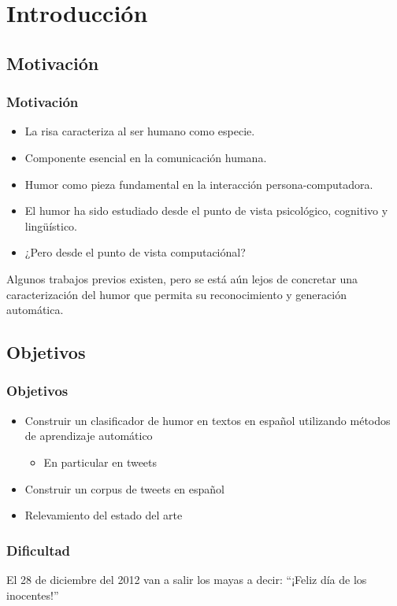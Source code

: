 \section{Introducción} 

\subsection{Motivación}

\begin{frame}[allowframebreaks]
    \frametitle{Motivación}
    \begin{itemize}
        \item La risa caracteriza al ser humano como especie.
        \item Componente esencial en la comunicación humana.
        \item Humor como pieza fundamental en la interacción persona-computadora.
    \end{itemize}

    \framebreak
    
    \begin{itemize}
        \item El humor ha sido estudiado desde el punto de vista psicológico, cognitivo y lingüístico.
        \item ¿Pero desde el punto de vista computaciónal?
    \end{itemize}
    Algunos trabajos previos existen, pero se está aún lejos de concretar una caracterización del humor que permita su reconocimiento y generación automática.
\end{frame}

\subsection{Objetivos}

\begin{frame}
    \frametitle{Objetivos}
    \begin{itemize}
        \item Construir un clasificador de humor en textos en español utilizando métodos de aprendizaje automático
            \begin{itemize}
                \item En particular en tweets
            \end{itemize}
        \item Construir un corpus de tweets en español
        \item Relevamiento del estado del arte
    \end{itemize}
\end{frame}


\begin{frame}
    \frametitle{Dificultad}
    El 28 de diciembre del 2012 van a salir los mayas a decir: ``¡Feliz día de los inocentes!''
\end{frame}
